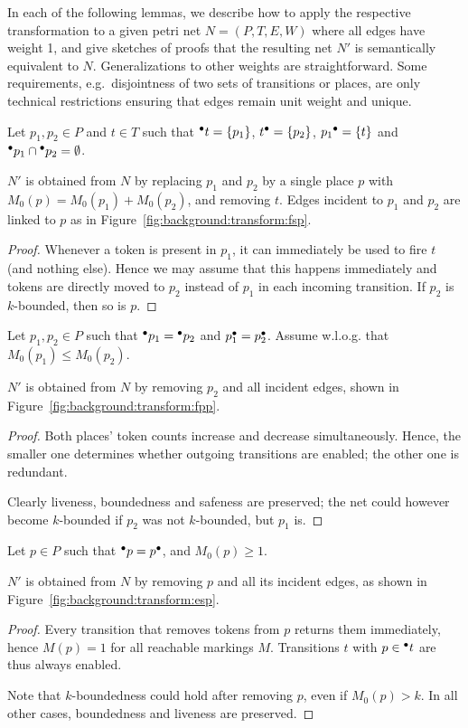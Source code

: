 In each of the following lemmas, we describe how to apply the respective transformation to a given petri net $N=(P,T,E,W)$ where all edges have weight 1, and give sketches of proofs that the resulting net $N'$ is semantically equivalent to $N$. Generalizations to other weights are straightforward. Some requirements, e.g.\ disjointness of two sets of transitions or places, are only technical restrictions ensuring that edges remain unit weight and unique.

\begin{lemma}
	Let $p_1,p_2\in P$ and $t\in T$ such that ${}^\bullet t=\left\{p_1\right\}$, $t{}^\bullet=\left\{p_2\right\}$, $p_1{}^\bullet=\left\{t\right\}$ and ${}^\bullet p_1\cap{}^\bullet p_2=\emptyset$.
	
	$N'$ is obtained from $N$ by replacing $p_1$ and $p_2$ by a single place $p$ with $M_0(p)=M_0(p_1)+M_0(p_2)$, and removing $t$. Edges incident to $p_1$ and $p_2$ are linked to $p$ as in Figure~\ref{fig:background:transform:fsp}.
\end{lemma}
\begin{proof}
	Whenever a token is present in $p_1$, it can immediately be used to fire $t$ (and nothing else). Hence we may assume that this happens immediately and tokens are directly moved to $p_2$ instead of $p_1$ in each incoming transition. If $p_2$ is $k$-bounded, then so is $p$.
\end{proof}

\begin{lemma}
	Let $p_1,p_2\in P$ such that ${}^\bullet p_1={}^\bullet p_2$ and $p{}^\bullet_1=p{}^\bullet_2$. Assume w.l.o.g. that $M_0(p_1)\le M_0(p_2)$.
	
	$N'$ is obtained from $N$ by removing $p_2$ and all incident edges, shown in Figure~\ref{fig:background:transform:fpp}.
\end{lemma}
\begin{proof}
	Both places' token counts increase and decrease simultaneously. Hence, the smaller one determines whether outgoing transitions are enabled; the other one is redundant.
	
	Clearly liveness, boundedness and safeness are preserved; the net could however become $k$-bounded if $p_2$ was not $k$-bounded, but $p_1$ is.
\end{proof}

\begin{lemma}
	Let $p\in P$ such that ${}^\bullet p=p{}^\bullet$, and $M_0(p)\ge 1$.
	
	$N'$ is obtained from $N$ by removing $p$ and all its incident edges, as shown in Figure~\ref{fig:background:transform:esp}.
\end{lemma}
\begin{proof}
	Every transition that removes tokens from $p$ returns them immediately, hence $M(p)=1$ for all reachable markings $M$. Transitions $t$ with $p\in{}^\bullet t$ are thus always enabled.
	
	Note that $k$-boundedness could hold after removing $p$, even if $M_0(p)>k$. In all other cases, boundedness and liveness are preserved.
\end{proof}

